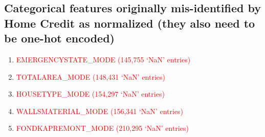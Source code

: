 \documentclass[12pt, letterpaper]{article}
\begin{document}
\begin{appendices}
\subsection{Categorical features originally mis-identified by Home Credit as normalized (they also need to be one-hot encoded)}
\label{catfeatorigmisidentified}
\footnotesize
\begin{enumerate}
 \item \textcolor{red}{EMERGENCYSTATE_MODE (145,755 `NaN' entries)}
 \item \textcolor{red}{TOTALAREA_MODE (148,431 `NaN' entries)}
 \item \textcolor{red}{HOUSETYPE_MODE (154,297 `NaN' entries)}
 \item \textcolor{red}{WALLSMATERIAL_MODE (156,341 `NaN' entries)}
 \item \textcolor{red}{FONDKAPREMONT_MODE (210,295 `NaN' entries)}
\end{enumerate}
\normalsize


\end{appendices}
\end{document}
